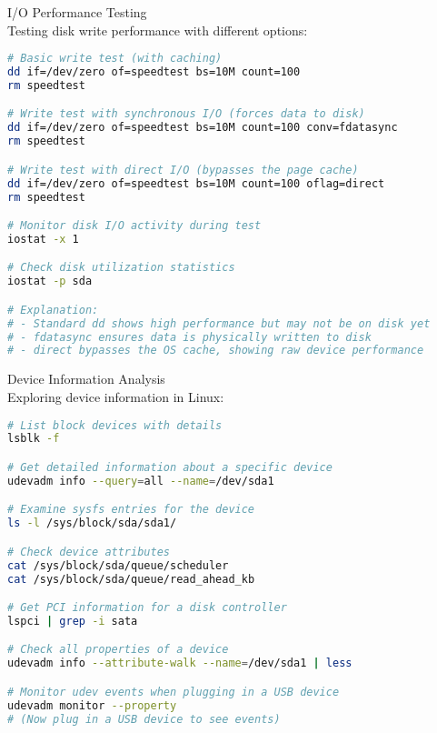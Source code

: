 \begin{example2}{I/O Performance Testing}\\
    Testing disk write performance with different options:
    
\begin{lstlisting}[language=bash, style=basesmol]
# Basic write test (with caching)
dd if=/dev/zero of=speedtest bs=10M count=100
rm speedtest

# Write test with synchronous I/O (forces data to disk)
dd if=/dev/zero of=speedtest bs=10M count=100 conv=fdatasync
rm speedtest

# Write test with direct I/O (bypasses the page cache)
dd if=/dev/zero of=speedtest bs=10M count=100 oflag=direct
rm speedtest

# Monitor disk I/O activity during test
iostat -x 1

# Check disk utilization statistics
iostat -p sda

# Explanation:
# - Standard dd shows high performance but may not be on disk yet
# - fdatasync ensures data is physically written to disk
# - direct bypasses the OS cache, showing raw device performance
\end{lstlisting}
\end{example2}

\begin{example2}{Device Information Analysis}\\
    Exploring device information in Linux:
    
\begin{lstlisting}[language=bash, style=basesmol]
# List block devices with details
lsblk -f

# Get detailed information about a specific device
udevadm info --query=all --name=/dev/sda1

# Examine sysfs entries for the device
ls -l /sys/block/sda/sda1/

# Check device attributes
cat /sys/block/sda/queue/scheduler
cat /sys/block/sda/queue/read_ahead_kb

# Get PCI information for a disk controller
lspci | grep -i sata

# Check all properties of a device
udevadm info --attribute-walk --name=/dev/sda1 | less

# Monitor udev events when plugging in a USB device
udevadm monitor --property
# (Now plug in a USB device to see events)
\end{lstlisting}
\end{example2}